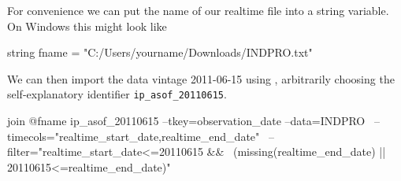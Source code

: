 For convenience we can put the name of our realtime file into a
string variable. On Windows this might look like
\begin{code}
string fname = "C:/Users/yourname/Downloads/INDPRO.txt"
\end{code}

We can then import the data vintage 2011-06-15 using ,
arbitrarily choosing the self-explanatory identifier
\texttt{ip\_asof\_20110615}.

\begin{code}
join @fname ip_asof_20110615 --tkey=observation_date --data=INDPRO \
--timecols="realtime_start_date,realtime_end_date" \
--filter="realtime_start_date<=20110615 && \
(missing(realtime_end_date) || 20110615<=realtime_end_date)"
\end{code}

